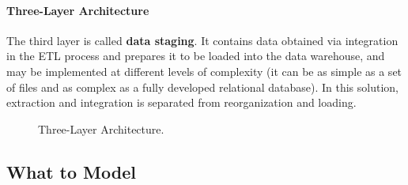 \paragraph{Three-Layer Architecture} The third layer is called \textbf{data staging}. It contains data obtained via integration in the ETL process and prepares it to be loaded into the data warehouse, and may be implemented at different levels of complexity (it can be as simple as a set of files and as complex as a fully developed relational database). In this solution, extraction and integration is separated from reorganization and loading.
\begin{figure}[h]
    \centering
    
    \caption{Three-Layer Architecture.}
\end{figure}

\subsection{What to Model}


